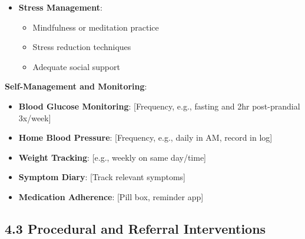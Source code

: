 \documentclass[11pt,letterpaper]{article}
\begin{document}
\begin{itemize}[leftmargin=*]
    \item \textbf{Stress Management}:
    \begin{itemize}
        \item Mindfulness or meditation practice
        \item Stress reduction techniques
        \item Adequate social support
    \end{itemize}
\end{itemize}

\textbf{Self-Management and Monitoring}:
\begin{itemize}[leftmargin=*]
    \item \textbf{Blood Glucose Monitoring}: [Frequency, e.g., fasting and 2hr post-prandial 3x/week]
    \item \textbf{Home Blood Pressure}: [Frequency, e.g., daily in AM, record in log]
    \item \textbf{Weight Tracking}: [e.g., weekly on same day/time]
    \item \textbf{Symptom Diary}: [Track relevant symptoms]
    \item \textbf{Medication Adherence}: [Pill box, reminder app]
\end{itemize}

\subsection*{4.3 Procedural and Referral Interventions}
\end{document}
